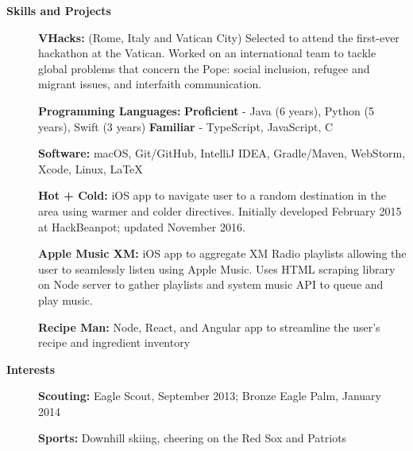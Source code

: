 \documentclass[letterpaper,10pt]{article}
\newcommand{\resheading}[1]{{\large \colorbox{mygrey}{\begin{minipage}{\textwidth}{\textbf{#1 \vphantom{p\^{E}}}}\end{minipage}}}}
\begin{document}
\resheading{Skills and Projects}
{\small
	\begin{description}
		\item[] \hspace{0.03in} \textbf{VHacks:} {\footnotesize (Rome, Italy and Vatican City) Selected to attend the first-ever hackathon at the Vatican. Worked on an international team to tackle global problems that concern the Pope: social inclusion, refugee and migrant issues, and interfaith communication.}
		\item[] \hspace{0.03in} \textbf{Programming Languages:} {\footnotesize \textbf{Proficient} - Java (6 years), Python (5 years), Swift (3 years) \enspace \textbf{Familiar} - TypeScript, JavaScript, C}
		\item[] \hspace{0.03in} \textbf{Software:} {\footnotesize macOS, Git/GitHub, IntelliJ IDEA, Gradle/Maven, WebStorm, Xcode, Linux, \LaTeX}
		\item[] \hspace{0.03in} \textbf{Hot + Cold:} {\footnotesize iOS app to navigate user to a random destination in the area using warmer and colder directives. Initially developed February 2015 at HackBeanpot; updated November 2016.}
		\item[] \hspace{0.03in} \textbf{Apple Music XM:} {\footnotesize iOS app to aggregate XM Radio playlists allowing the user to seamlessly listen using Apple Music. Uses HTML scraping library on Node server to gather playlists and system music API to queue and play music.}
		\item[] \hspace{0.03in} \textbf{Recipe Man:} {\footnotesize Node, React, and Angular app to streamline the user's recipe and ingredient inventory}
\end{description}}

\resheading{Interests}
{\small
	\begin{description}
		\item[] \hspace{0.03in} \textbf{Scouting:} {\footnotesize Eagle Scout, September 2013; Bronze Eagle Palm, January 2014}
		\item[] \hspace{0.03in} \textbf{Sports:} {\footnotesize Downhill skiing, cheering on the Red Sox and Patriots}
	\end{description}}
\end{document}
